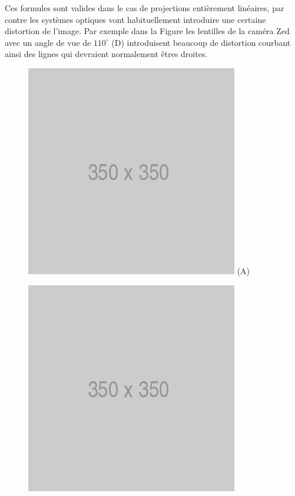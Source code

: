 Ces formules sont valides dans le cas de projections entièrement linéaires, par contre les systèmes optiques vont habituellement introduire une certaine distortion de l'image. Par exemple dans la Figure \label{fig:distortion} les lentilles de la caméra Zed avec un angle de vue de $110^\circ$ (D) introduisent beaucoup de distortion courbant ainsi des lignes qui devraient normalement êtres droites.

\begin{figure}[htp]
  \centering
  \begin{minipage}{0.4\textwidth}
    \centering
    \includegraphics[width=\linewidth]{images/placeholder.png}
    (A)
  \end{minipage}
  \begin{minipage}{0.4\textwidth}
    \centering
    \includegraphics[width=\linewidth]{images/placeholder.png}

\end{minipage}
\end{figure}
